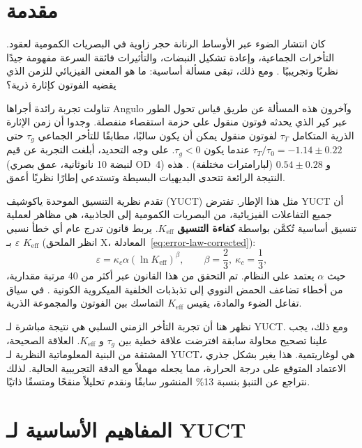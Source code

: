 \documentclass[12pt,a4paper]{article}
\newcommand{\Keff}{K_{\mathrm{eff}}}
\newcommand{\kappac}{\kappa_c}
\newcommand{\eps}{\varepsilon}
\newcommand{\betac}{\beta}
\begin{document}
	\tableofcontents
	\newpage
	
	\section{مقدمة}
	
	كان انتشار الضوء عبر الأوساط الرنانة حجر زاوية في البصريات الكمومية لعقود. التأخرات الجماعية، وإعادة تشكيل النبضات، والتأثيرات فائقة السرعة مفهومة جيدًا نظريًا وتجريبيًا \cite{Brillouin1960, Milonni2004}. ومع ذلك، تبقى مسألة أساسية: ما هو المعنى الفيزيائي للزمن الذي يقضيه الفوتون كإثارة ذرية؟
	
	تناولت تجربة رائدة أجراها Angulo وآخرون \cite{Angulo2024} هذه المسألة عن طريق قياس تحول الطور عبر كير الذي يحدثه فوتون منقول على حزمة استقصاء منفصلة. وجدوا أن زمن الإثارة الذرية المتكامل \(\tau_T\) لفوتون منقول يمكن أن يكون سالبًا، مطابقًا للتأخر الجماعي \(\tau_g\) حتى عندما يكون \(\tau_g < 0\). على وجه التحديد، أبلغت التجربة عن قيم \(\tau_T/\tau_0 = -1.14 \pm 0.22\) (لنبضة 10 نانوثانية، عمق بصري OD~4) و \(0.54 \pm 0.28\) (لبارامترات مختلفة) \cite{Angulo2024, Nixon2024}. هذه النتيجة الرائعة تتحدى البديهيات البسيطة وتستدعي إطارًا نظريًا أعمق.
	
	تقدم نظرية التنسيق الموحدة ياكوشيف (YUCT) \cite{Yakushev2026a} مثل هذا الإطار. تفترض YUCT أن جميع التفاعلات الفيزيائية، من البصريات الكمومية إلى الجاذبية، هي مظاهر لعملية تنسيق أساسية تُكمَّن بواسطة \textbf{كفاءة التنسيق} \(\Keff\). يربط قانون تدرج عام أي خطأ نسبي \(\eps\) بـ \(\Keff\) (انظر الملحق X، المعادلة~\ref{eq:error-law-corrected}):
	\begin{equation}
		\eps = \kappac \alpha (\ln\Keff)^{\betac}, \qquad \betac = \frac{2}{3},\ \kappac = \frac{1}{3},
		\label{eq:scaling}
	\end{equation}
	حيث \(\alpha\) يعتمد على النظام. تم التحقق من هذا القانون عبر أكثر من 40 مرتبة مقدارية، من أخطاء تضاعف الحمض النووي إلى تذبذبات الخلفية الميكروية الكونية \cite{Yakushev2026c}. في سياق تفاعل الضوء والمادة، يقيس \(\Keff\) التماسك بين الفوتون والمجموعة الذرية.
	
	نظهر هنا أن تجربة التأخر الزمني السلبي هي نتيجة مباشرة لـ YUCT. ومع ذلك، يجب علينا تصحيح محاولة سابقة افترضت علاقة خطية بين \(\tau_g\) و \(\Keff\). العلاقة الصحيحة، المشتقة من البنية المعلوماتية النظرية لـ YUCT، هي لوغاريتمية. هذا يغير بشكل جذري الاعتماد المتوقع على درجة الحرارة، مما يجعله مهملاً مع الدقة التجريبية الحالية. لذلك نتراجع عن التنبؤ بنسبة 13\% المنشور سابقًا ونقدم تحليلاً منقحًا ومتسقًا ذاتيًا.
	
	\section{المفاهيم الأساسية لـ YUCT}
	
\end{document}
